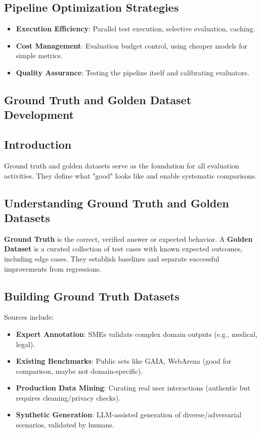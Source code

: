 \begin{TNtwocol}
\subsection{Pipeline Optimization Strategies}
\begin{itemize}
    \item \textbf{Execution Efficiency}: Parallel test execution, selective evaluation, caching.
    \item \textbf{Cost Management}: Evaluation budget control, using cheaper models for simple metrics.
    \item \textbf{Quality Assurance}: Testing the pipeline itself and calibrating evaluators.
\end{itemize}
\end{TNtwocol}
\begin{TNtwocol}
\section{Ground Truth and Golden Dataset Development }
\subsection{Introduction}
Ground truth and golden datasets serve as the foundation for all evaluation activities. They define what "good" looks like and enable systematic comparisons.

\subsection{Understanding Ground Truth and Golden Datasets}
\textbf{Ground Truth} is the correct, verified answer or expected behavior. A \textbf{Golden Dataset} is a curated collection of test cases with known expected outcomes, including edge cases. They establish baselines and separate successful improvements from regressions.

\subsection{Building Ground Truth Datasets}
Sources include:
\begin{itemize}
    \item \textbf{Expert Annotation}: SMEs validate complex domain outputs (e.g., medical, legal).
    \item \textbf{Existing Benchmarks}: Public sets like GAIA, WebArena (good for comparison, maybe not domain-specific).
    \item \textbf{Production Data Mining}: Curating real user interactions (authentic but requires cleaning/privacy checks).
    \item \textbf{Synthetic Generation}: LLM-assisted generation of diverse/adversarial scenarios, validated by humans.
\end{itemize}


\end{TNtwocol}
